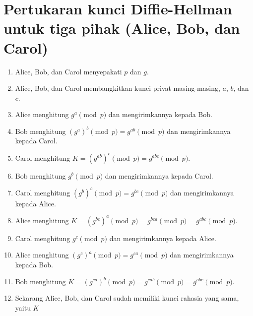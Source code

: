 \documentclass{article}
\begin{document}

\section*{Pertukaran kunci Diffie-Hellman untuk tiga pihak (Alice, Bob, dan Carol)}

\begin{enumerate}
  \item Alice, Bob, dan Carol menyepakati $p$ dan $g$.
  \item Alice, Bob, dan Carol membangkitkan kunci privat masing-masing, $a$, $b$, dan $c$.
  \item Alice menghitung $g^a \pmod p$ dan mengirimkannya kepada Bob.
  \item Bob menghitung $(g^a)^b \pmod p = g^{ab} \pmod p$ dan mengirimkannya kepada Carol.
  \item Carol menghitung $K = (g^{ab})^c \pmod p = g^{abc} \pmod p$.
  \item Bob menghitung $g^b \pmod p$ dan mengirimkannya kepada Carol.
  \item Carol menghitung $(g^b)^c \pmod p = g^{bc} \pmod p$ dan mengirimkannya kepada Alice.
  \item Alice menghitung $K = (g^{bc})^a \pmod p = g^{bca} \pmod p = g^{abc} \pmod p$.
  \item Carol menghitung $g^c \pmod p$ dan mengirimkannya kepada Alice.
  \item Alice menghitung $(g^c)^a \pmod p = g^{ca} \pmod p$ dan mengirimkannya kepada Bob.
  \item Bob menghitung $K = (g^{ca})^b \pmod p = g^{cab} \pmod p = g^{abc} \pmod p$.
  \item Sekarang Alice, Bob, dan Carol sudah memiliki kunci rahasia yang sama, yaitu $K$
\end{enumerate}
\end{document}
